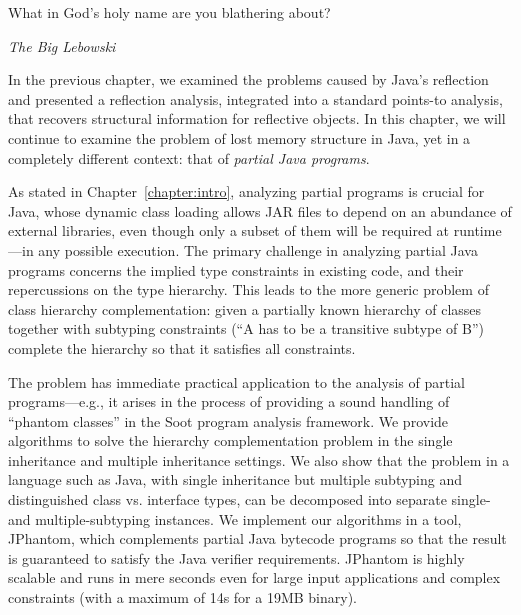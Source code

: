 \label{chapter:complementation}
\epigraph{What in God's holy name are you blathering
  about?}{\textit{The Big Lebowski}}

In the previous chapter, we examined the problems caused by Java's
reflection and presented a reflection analysis, integrated into a
standard points-to analysis, that recovers structural information for
reflective objects. In this chapter, we will continue to examine the
problem of lost memory structure in Java, yet in a completely
different context: that of \emph{partial Java programs}.

As stated in Chapter~\ref{chapter:intro}, analyzing partial programs
is crucial for Java, whose dynamic class loading allows JAR files to
depend on an abundance of external libraries, even though only a
subset of them will be required at runtime---in any possible
execution. The primary challenge in analyzing partial Java programs
concerns the implied type constraints in existing code, and their
repercussions on the type hierarchy.
This leads to the more generic problem of class hierarchy
complementation: given a partially known hierarchy of classes together
with subtyping constraints (``A has to be a transitive subtype of B'')
complete the hierarchy so that it satisfies all constraints.

The problem has immediate practical application to the analysis of
partial programs---e.g., it arises in the process of providing a sound
handling of ``phantom classes'' in the Soot program analysis
framework. We provide algorithms to solve the hierarchy
complementation problem in the single inheritance and multiple
inheritance settings.
We also show that the problem in a language such as Java, with single
inheritance but multiple subtyping and distinguished class
vs. interface types, can be decomposed into separate single- and
multiple-subtyping instances.  We implement our algorithms in a
tool, JPhantom, which complements partial Java bytecode programs so that
the result is guaranteed to satisfy the Java verifier
requirements. JPhantom is highly scalable and runs in mere seconds
even for large input applications and complex constraints (with a maximum
of 14s for a 19MB binary).


